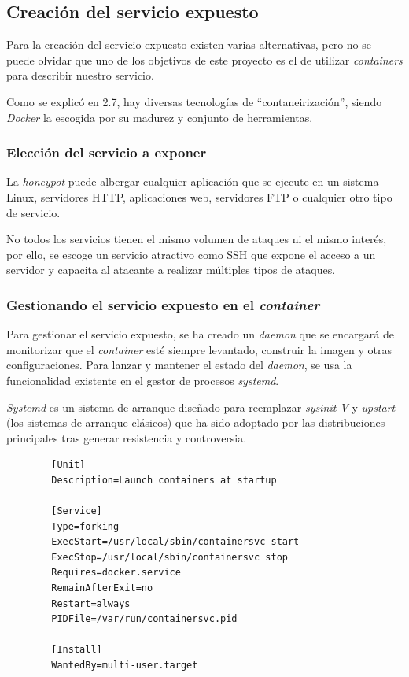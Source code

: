 \subsection{Creación del servicio expuesto}

Para la creación del servicio expuesto existen varias alternativas, pero no se puede olvidar que uno de los objetivos de este proyecto es el de utilizar \emph{containers} para describir nuestro servicio.

Como se explicó en 2.7, hay diversas tecnologías de ``contaneirización'', siendo \emph{Docker} la escogida por su madurez y conjunto de herramientas. 

\subsubsection{Elección del servicio a exponer}

La \emph{honeypot} puede albergar cualquier aplicación que se ejecute en un sistema Linux, servidores HTTP, aplicaciones
web, servidores FTP o cualquier otro tipo de servicio.

No todos los servicios tienen el mismo volumen de ataques ni el mismo interés, por ello, se escoge un servicio atractivo como SSH que 
expone el acceso a un servidor y capacita al atacante a realizar múltiples tipos de ataques.

\subsubsection{Gestionando el servicio expuesto en el \emph{container}}

Para gestionar el servicio expuesto, se ha creado un \emph{daemon} que se encargará de monitorizar que el \emph{container} esté siempre levantado, construir
la imagen y otras configuraciones. Para lanzar y mantener el estado del \emph{daemon}, se usa la funcionalidad existente en el gestor de procesos \emph{systemd}.

\emph{Systemd} es un sistema de arranque diseñado para reemplazar \emph{sysinit V} y \emph{upstart} (los sistemas de arranque clásicos) que ha sido adoptado
por las distribuciones principales tras generar resistencia y controversia.

    \begin{verbatim}
        [Unit]
        Description=Launch containers at startup
        
        [Service]
        Type=forking
        ExecStart=/usr/local/sbin/containersvc start
        ExecStop=/usr/local/sbin/containersvc stop
        Requires=docker.service
        RemainAfterExit=no
        Restart=always
        PIDFile=/var/run/containersvc.pid
        
        [Install]
        WantedBy=multi-user.target
    \end{verbatim}


